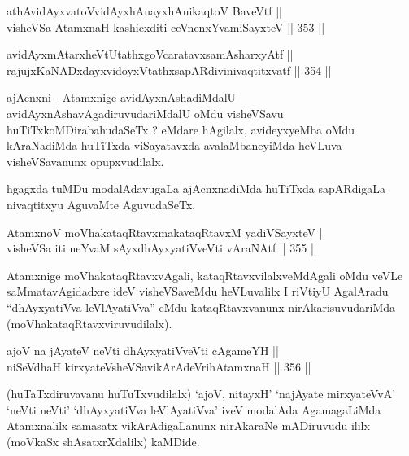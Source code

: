 \begin{shl}
athAvidAyxvatoV\s vidAyxhAnayxhAnikaqtoV BaveVtf || \\
visheVSa AtamxnaH kashicxditi ceVnenxYvamiSayxteV ||  353 ||  
\end{shl}

\begin{shl}
avidAyxmAtarxheVtUtathxgoVcaratavxsamAsharxyAtf || \\
rajujxKaNADxdayxvidoyxVtathxsapARdivinivaqtitxvatf ||  354 ||  
\end{shl}

\begin{artha}
ajAcnxni - Atamxnige avidAyxnAshadiMdalU
avidAyxnAshavAgadiruvudariMdalU oMdu visheVSavu
huTiTxkoMDirabahudaSeTx ? eMdare hAgilalx, avideyxyeMba oMdu
kAraNadiMda huTiTxda viSayatavxda avalaMbaneyiMda heVLuva
visheVSavanunx opupxvudilalx.
\end{artha}

\begin{artha}
hgagxda tuMDu modalAdavugaLa ajAcnxnadiMda huTiTxda sapARdigaLa
nivaqtitxyu AguvaMte AguvudaSeTx.
\end{artha}


\begin{shl}
AtamxnoV moVhakataqRtavxmakataqRtavxM yadiVSayxteV || \\
visheVSa iti neYvaM sAyxdhAyxyatiVveVti vAraNAtf ||  355 ||  
\end{shl}

\begin{artha}
Atamxnige moVhakataqRtavxvAgali, kataqRtavxvilalxveMdAgali oMdu veVLe
saMmatavAgidadxre ideV visheVSaveMdu heVLuvalilx I riVtiyU AgalAradu
``dhAyxyatiVva leVlAyatiVva'' eMdu kataqRtavxvanunx
nirAkarisuvudariMda (moVhakataqRtavxviruvudilalx).
\end{artha}


\begin{shl}
ajoV na jAyateV neVti dhAyxyatiVveVti cA\s \s gameYH || \\
niSeVdhaH kirxyateV\s sheVSavikArAdeVrihA\s \s tamxnaH ||  356 ||  
\end{shl}

\begin{artha}
(huTaTxdiruvavanu huTuTxvudilalx) `ajoV, nitayxH' `najAyate
mirxyateVvA' `neVti neVti' `dhAyxyatiVva leVlAyatiVva' iveV modalAda
AgamagaLiMda Atamxnalilx samasatx vikArAdigaLanunx nirAkaraNe
mADiruvudu ililx (moVkaSx shAsatxrXdalilx) kaMDide.
\end{artha}

